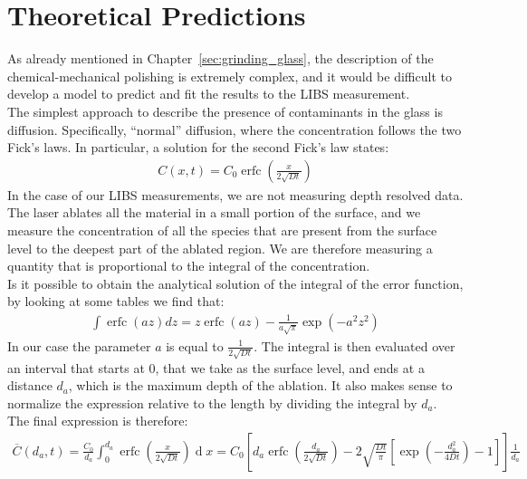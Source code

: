 \section{Theoretical Predictions}
\label{sec:theoretical_prediction}
As already mentioned in Chapter~\ref{sec:grinding_glass}, the description of the chemical-mechanical polishing is extremely complex, and it would be difficult to develop a model to predict and fit the results to the LIBS measurement.
\\
The simplest approach to describe the presence of contaminants in the glass is diffusion. Specifically, “normal” diffusion, where the concentration follows the two Fick’s laws. In particular, a solution for the second Fick’s law states:
\begin{align}
    C\left(x,t\right)=C_0\operatorname{erfc}\left(\frac{x}{2\sqrt{Dt}}\right) \label{eq:second_fick}
\end{align}
In the case of our LIBS measurements, we are not measuring depth resolved data. The laser ablates all the material in a small portion of the surface, and we measure the concentration of all the species that are present from the surface level to the deepest part of the ablated region. We are therefore measuring a quantity that is proportional to the integral of the concentration.
\\
Is it possible to obtain the analytical solution of the integral of the error function, by looking at some tables we find that:
\begin{align}
    \int\operatorname{erfc}\left(az\right)dz=z\operatorname{erfc}\left(az\right)-\frac{1}{a\sqrt\pi}\exp{\left(-a^2z^2\right)} \label{eq:integral_erfc}
\end{align}
In our case the parameter $a$ is equal to $\frac{1}{2\sqrt{Dt}}$. The integral is then evaluated over an interval that starts at 0, that we take as the surface level, and ends at a distance $d_a$, which is the maximum depth of the ablation. It also makes sense to normalize the expression relative to the length by dividing the integral by $d_a$.
\\
The final expression is therefore: 
 \begin{align}
    \overline{C}\left(d_{a},t\right)=\frac{C_{0}}{d_a}\int_{0}^{d_{a}}\operatorname{erfc}\left(\frac{x}{2\sqrt{Dt}}\right)\operatorname{d}x=C_{0}\left[d_{a}\operatorname{erfc}\left(\frac{d_{a}}{2\sqrt{Dt}}\right)-2\sqrt{\frac{Dt}{\pi}}\left[\exp\left(-\frac{d_{a}^{2}}{4Dt}\right)-1\right]\right]\frac{1}{d_a} \label{eq:c_bar_equation}
 \end{align}
